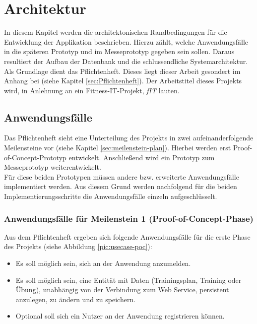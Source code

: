 \chapter{Architektur}
\label{cha:architektur}
In diesem Kapitel werden die architektonischen Randbedingungen für die Entwicklung der Applikation beschrieben. Hierzu zählt, welche Anwendungsfälle in die späteren Prototyp und im Messeprototyp gegeben sein sollen. Daraus resultiert der Aufbau der Datenbank und die schlussendliche Systemarchitektur. Als Grundlage dient das Pflichtenheft. Dieses liegt dieser Arbeit gesondert im Anhang bei (siehe Kapitel \ref{sec:Pflichtenheft}). Der Arbeitstitel dieses Projekts wird, in Anlehnung an ein Fitness-IT-Projekt, \textit{fIT} lauten. 

\section{Anwendungsfälle}
\label{sec:anwendungsfaelle}
Das Pflichtenheft sieht eine Unterteilung des Projekts in zwei aufeinanderfolgende Meilensteine vor (siehe Kapitel \ref{sec:meilenstein-plan}). Hierbei werden erst Proof-of-Concept-Prototyp entwickelt. Anschließend wird ein Prototyp zum Messeprototyp weiterentwickelt. \\
Für diese beiden Prototypen müssen andere bzw. erweiterte Anwendungsfälle implementiert werden. Aus diesem Grund werden nachfolgend für die beiden Implementierungsschritte die Anwendungsfälle einzeln aufgeschlüsselt. 
\subsection{Anwendungsfälle für Meilenstein 1 (Proof-of-Concept-Phase)}
\label{ssec:anwendungsfaelle-poc}
Aus dem Pflichtenheft ergeben sich folgende Anwendungsfälle für die erste Phase des Projekts (siehe Abbildung \ref{pic:usecase-poc}):
\begin{itemize}
\item Es soll möglich sein, sich an der Anwendung anzumelden.
\item Es soll möglich sein, eine Entität mit Daten (Trainingsplan, Training oder Übung), unabhängig von der Verbindung zum Web Service, persistent anzulegen, zu ändern und zu speichern.
\item Optional soll sich ein Nutzer an der Anwendung registrieren können.
\end{itemize}


